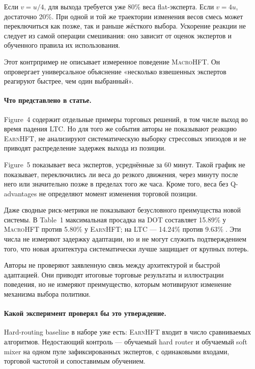 \documentclass[9pt,a4paper,twocolumn]{extarticle}
\newcommand{\Macro}{\textsc{MacroHFT}}
\newcommand{\Earn}{\textsc{EarnHFT}}
\begin{document}
Если $v=u/4$, для выхода требуется уже 80\% веса flat-эксперта. Если $v=4u$, достаточно 20\%.
При одной и той же траектории изменения весов смесь может переключиться как позже, так и раньше
жёсткого выбора. Ускорение реакции не следует из самой операции смешивания: оно зависит от
оценок экспертов и обученного правила их использования.

Этот контрпример не описывает измеренное поведение \Macro{}. Он опровергает универсальное
объяснение «несколько взвешенных экспертов реагируют быстрее, чем один выбранный».

\paragraph{Что представлено в статье.}

Figure~4 содержит отдельные примеры торговых решений, в том числе выход во время падения LTC. Но
для того же события авторы не показывают реакцию \Earn{}, не анализируют систематическую выборку
стрессовых эпизодов и не приводят распределение задержек выхода из позиции.

Figure~5 показывает веса экспертов, усреднённые за 60 минут. Такой график не показывает,
переключились ли веса до резкого движения, через минуту после него или значительно позже в
пределах того же часа. Кроме того, веса без Q-advantages не определяют момент изменения торговой
позиции.

Даже сводные риск-метрики не показывают безусловного преимущества новой системы. В Table~1
максимальная просадка на DOT составляет 15.89\% у \Macro{} против 5.80\% у \Earn{};
на LTC --- 14.24\% против 9.63\% \cite{zong2024macrohft}. Эти числа не измеряют задержку
адаптации, но и не могут служить подтверждением того, что новая архитектура систематически
лучше защищает от крупных потерь.

Авторы не проверяют заявленную связь между архитектурой и быстрой адаптацией. Они приводят
итоговые торговые результаты и иллюстрации поведения, но не измеряют преимущество, которым
мотивируют изменение механизма выбора политики.

\paragraph{Какой эксперимент проверял бы это утверждение.}

Hard-routing baseline в наборе уже есть: \Earn{} входит в число сравниваемых алгоритмов.
Недостающий контроль --- обучаемый hard router и обучаемый soft mixer на одном пуле
зафиксированных экспертов, с одинаковыми входами, торговой частотой и сопоставимым обучением.
\end{document}
